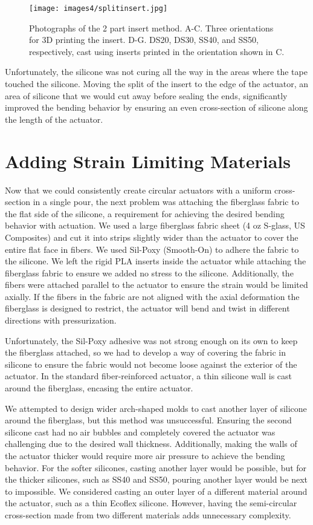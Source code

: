 \begin{figure}[ht!]
    \centering
    \texttt{[image: images4/splitinsert.jpg]}
    \caption{Photographs of the 2 part insert method. A-C. Three orientations for 3D printing the insert. D-G. DS20, DS30, SS40, and SS50, respectively, cast using inserts printed in the orientation shown in C.}
    \label{fig:splitinsert}
\end{figure}

Unfortunately, the silicone was not curing all the way in the areas where the tape touched the silicone. Moving the split of the insert to the edge of the actuator, an area of silicone that we would cut away before sealing the ends, significantly improved the bending behavior by ensuring an even cross-section of silicone along the length of the actuator. 

\clearpage
\section{Adding Strain Limiting Materials}

Now that we could consistently create circular actuators with a uniform cross-section in a single pour, the next problem was attaching the fiberglass fabric to the flat side of the silicone, a requirement for achieving the desired bending behavior with actuation. We used a large fiberglass fabric sheet (4 oz S-glass, US Composites) and cut it into strips slightly wider than the actuator to cover the entire flat face in fibers. We used Sil-Poxy (Smooth-On) to adhere the fabric to the silicone. We left the rigid PLA inserts inside the actuator while attaching the fiberglass fabric to ensure we added no stress to the silicone. Additionally, the fibers were attached parallel to the actuator to ensure the strain would be limited axially. If the fibers in the fabric are not aligned with the axial deformation the fiberglass is designed to restrict, the actuator will bend and twist in different directions with pressurization. 

Unfortunately, the Sil-Poxy adhesive was not strong enough on its own to keep the fiberglass attached, so we had to develop a way of covering the fabric in silicone to ensure the fabric would not become loose against the exterior of the actuator. In the standard fiber-reinforced actuator, a thin silicone wall is cast around the fiberglass, encasing the entire actuator. 

We attempted to design wider arch-shaped molds to cast another layer of silicone around the fiberglass, but this method was unsuccessful. Ensuring the second silicone cast had no air bubbles and completely covered the actuator was challenging due to the desired wall thickness. Additionally, making the walls of the actuator thicker would require more air pressure to achieve the bending behavior. For the softer silicones, casting another layer would be possible, but for the thicker silicones, such as SS40 and SS50, pouring another layer would be next to impossible. We considered casting an outer layer of a different material around the actuator, such as a thin Ecoflex silicone. However, having the semi-circular cross-section made from two different materials adds unnecessary complexity. 

